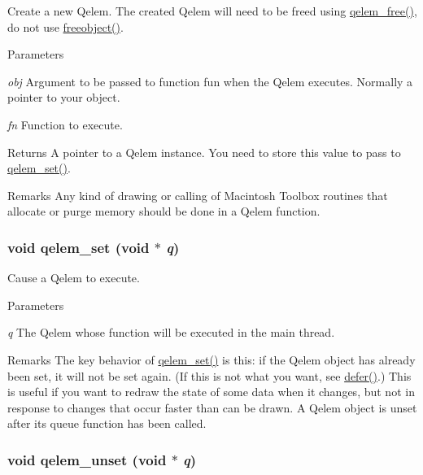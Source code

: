Create a new Qelem. The created Qelem will need to be freed using \hyperlink{group__qelems_ga7cfcb3134eb0baf335847906a14a08d0}{qelem\_\-free()}, do not use \hyperlink{group__class__old_gadf30646e52376a37b93cc20efac65636}{freeobject()}.


\begin{DoxyParams}{Parameters}
\item[{\em obj}]Argument to be passed to function fun when the Qelem executes. Normally a pointer to your object. \item[{\em fn}]Function to execute. \end{DoxyParams}
\begin{DoxyReturn}{Returns}
A pointer to a Qelem instance. You need to store this value to pass to \hyperlink{group__qelems_ga3e292aad133af89a87e167e88cc4a1b5}{qelem\_\-set()}.
\end{DoxyReturn}
\begin{DoxyRemark}{Remarks}
Any kind of drawing or calling of Macintosh Toolbox routines that allocate or purge memory should be done in a Qelem function. 
\end{DoxyRemark}
\hypertarget{group__qelems_ga3e292aad133af89a87e167e88cc4a1b5}{
\subsubsection[{qelem\_\-set}]{\setlength{\rightskip}{0pt plus 5cm}void qelem\_\-set (void $\ast$ {\em q})}}
\label{group__qelems_ga3e292aad133af89a87e167e88cc4a1b5}


Cause a Qelem to execute. 
\begin{DoxyParams}{Parameters}
\item[{\em q}]The Qelem whose function will be executed in the main thread.\end{DoxyParams}
\begin{DoxyRemark}{Remarks}
The key behavior of \hyperlink{group__qelems_ga3e292aad133af89a87e167e88cc4a1b5}{qelem\_\-set()} is this: if the Qelem object has already been set, it will not be set again. (If this is not what you want, see \hyperlink{group__threading_gaa24a0c9896f1ad241e45590065c3f643}{defer()}.) This is useful if you want to redraw the state of some data when it changes, but not in response to changes that occur faster than can be drawn. A Qelem object is unset after its queue function has been called. 
\end{DoxyRemark}
\hypertarget{group__qelems_ga021eca2eff6e47ff97ca112fb2eaf866}{
\subsubsection[{qelem\_\-unset}]{\setlength{\rightskip}{0pt plus 5cm}void qelem\_\-unset (void $\ast$ {\em q})}}
\label{group__qelems_ga021eca2eff6e47ff97ca112fb2eaf866}


